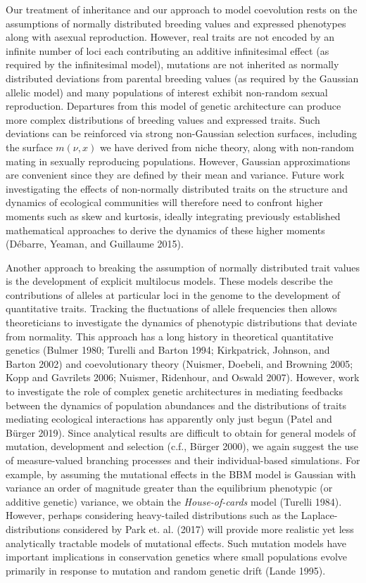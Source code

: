\documentclass[]{article}
\begin{document}
Our treatment of inheritance and our approach to model coevolution rests
on the assumptions of normally distributed breeding values and expressed
phenotypes along with asexual reproduction. However, real traits are not
encoded by an infinite number of loci each contributing an additive
infinitesimal effect (as required by the infinitesimal model), mutations
are not inherited as normally distributed deviations from parental
breeding values (as required by the Gaussian allelic model) and many
populations of interest exhibit non-random sexual reproduction.
Departures from this model of genetic architecture can produce more
complex distributions of breeding values and expressed traits. Such
deviations can be reinforced via strong non-Gaussian selection surfaces,
including the surface \(m(\nu,x)\) we have derived from niche theory,
along with non-random mating in sexually reproducing populations.
However, Gaussian approximations are convenient since they are defined
by their mean and variance. Future work investigating the effects of
non-normally distributed traits on the structure and dynamics of
ecological communities will therefore need to confront higher moments
such as skew and kurtosis, ideally integrating previously established
mathematical approaches to derive the dynamics of these higher moments
(Débarre, Yeaman, and Guillaume 2015).

Another approach to breaking the assumption of normally distributed
trait values is the development of explicit multilocus models. These
models describe the contributions of alleles at particular loci in the
genome to the development of quantitative traits. Tracking the
fluctuations of allele frequencies then allows theoreticians to
investigate the dynamics of phenotypic distributions that deviate from
normality. This approach has a long history in theoretical quantitative
genetics (Bulmer 1980; Turelli and Barton 1994; Kirkpatrick, Johnson,
and Barton 2002) and coevolutionary theory (Nuismer, Doebeli, and
Browning 2005; Kopp and Gavrilets 2006; Nuismer, Ridenhour, and Oswald
2007). However, work to investigate the role of complex genetic
architectures in mediating feedbacks between the dynamics of population
abundances and the distributions of traits mediating ecological
interactions has apparently only just begun (Patel and Bürger 2019).
Since analytical results are difficult to obtain for general models of
mutation, development and selection (c.f., Bürger 2000), we again
suggest the use of measure-valued branching processes and their
individual-based simulations. For example, by assuming the mutational
effects in the BBM model is Gaussian with variance an order of magnitude
greater than the equilibrium phenotypic (or additive genetic) variance,
we obtain the \emph{House-of-cards} model (Turelli 1984). However,
perhaps considering heavy-tailed distributions such as the
Laplace-distributions considered by Park et. al. (2017) will provide
more realistic yet less analytically tractable models of mutational
effects. Such mutation models have important implications in
conservation genetics where small populations evolve primarily in
response to mutation and random genetic drift (Lande 1995).
\end{document}
